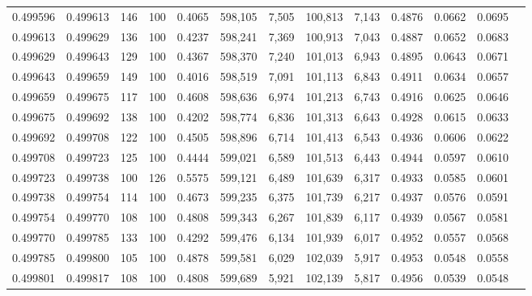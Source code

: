 \begin{tabular}{rrrrrrrrrrrrr}
0.499596 & 0.499613 &   146 & 100 &                                     0.4065 & 598,105 &   7,505 & 100,813 &   7,143 & 0.4876 & 0.0662 & 0.0695 \\
0.499613 & 0.499629 &   136 & 100 &                                     0.4237 & 598,241 &   7,369 & 100,913 &   7,043 & 0.4887 & 0.0652 & 0.0683 \\
0.499629 & 0.499643 &   129 & 100 &                                     0.4367 & 598,370 &   7,240 & 101,013 &   6,943 & 0.4895 & 0.0643 & 0.0671 \\
0.499643 & 0.499659 &   149 & 100 &                                     0.4016 & 598,519 &   7,091 & 101,113 &   6,843 & 0.4911 & 0.0634 & 0.0657 \\
0.499659 & 0.499675 &   117 & 100 &                                     0.4608 & 598,636 &   6,974 & 101,213 &   6,743 & 0.4916 & 0.0625 & 0.0646 \\
0.499675 & 0.499692 &   138 & 100 &                                     0.4202 & 598,774 &   6,836 & 101,313 &   6,643 & 0.4928 & 0.0615 & 0.0633 \\
0.499692 & 0.499708 &   122 & 100 &                                     0.4505 & 598,896 &   6,714 & 101,413 &   6,543 & 0.4936 & 0.0606 & 0.0622 \\
0.499708 & 0.499723 &   125 & 100 &                                     0.4444 & 599,021 &   6,589 & 101,513 &   6,443 & 0.4944 & 0.0597 & 0.0610 \\
0.499723 & 0.499738 &   100 & 126 &                                     0.5575 & 599,121 &   6,489 & 101,639 &   6,317 & 0.4933 & 0.0585 & 0.0601 \\
0.499738 & 0.499754 &   114 & 100 &                                     0.4673 & 599,235 &   6,375 & 101,739 &   6,217 & 0.4937 & 0.0576 & 0.0591 \\
0.499754 & 0.499770 &   108 & 100 &                                     0.4808 & 599,343 &   6,267 & 101,839 &   6,117 & 0.4939 & 0.0567 & 0.0581 \\
0.499770 & 0.499785 &   133 & 100 &                                     0.4292 & 599,476 &   6,134 & 101,939 &   6,017 & 0.4952 & 0.0557 & 0.0568 \\
0.499785 & 0.499800 &   105 & 100 &                                     0.4878 & 599,581 &   6,029 & 102,039 &   5,917 & 0.4953 & 0.0548 & 0.0558 \\
0.499801 & 0.499817 &   108 & 100 &                                     0.4808 & 599,689 &   5,921 & 102,139 &   5,817 & 0.4956 & 0.0539 & 0.0548 \\

\end{tabular}
